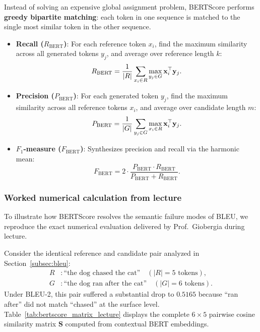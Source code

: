 \documentclass[../../../main.tex]{subfiles}
\begin{document}
Instead of solving an expensive global assignment problem, BERTScore performs \textbf{greedy bipartite matching}: each token in one sequence is matched to the single most similar token in the other sequence.
\begin{itemize}
    \item \textbf{Recall ($R_{\text{BERT}}$)}: For each reference token $x_i$, find the maximum similarity across all generated tokens $y_j$, and average over reference length $k$:
    \begin{equation}
    \label{eq:bertscore_recall}
    R_{\text{BERT}} = \frac{1}{|R|} \sum_{x_i \in R} \max_{y_j \in G} \mathbf{x}_i^\top \mathbf{y}_j.
    \end{equation}
    \item \textbf{Precision ($P_{\text{BERT}}$)}: For each generated token $y_j$, find the maximum similarity across all reference tokens $x_i$, and average over candidate length $m$:
    \begin{equation}
    \label{eq:bertscore_precision}
    P_{\text{BERT}} = \frac{1}{|G|} \sum_{y_j \in G} \max_{x_i \in R} \mathbf{x}_i^\top \mathbf{y}_j.
    \end{equation}
    \item \textbf{$F_1$-measure ($F_{\text{BERT}}$)}: Synthesizes precision and recall via the harmonic mean:
    \begin{equation}
    \label{eq:bertscore_f1}
    F_{\text{BERT}} = 2 \cdot \frac{P_{\text{BERT}} \cdot R_{\text{BERT}}}{P_{\text{BERT}} + R_{\text{BERT}}}.
    \end{equation}
\end{itemize}

\subsubsection{Worked numerical calculation from lecture}
To illustrate how BERTScore resolves the semantic failure modes of BLEU, we reproduce the exact numerical evaluation delivered by Prof.~Giobergia during lecture.

Consider the identical reference and candidate pair analyzed in Section~\ref{subsec:bleu}:
\begin{align*}
R &: \text{``the dog chased the cat''} \quad (|R| = 5 \text{ tokens}), \\
G &: \text{``the dog ran after the cat''} \quad (|G| = 6 \text{ tokens}).
\end{align*}
Under BLEU-2, this pair suffered a substantial drop to $0.5165$ because ``ran after'' did not match ``chased'' at the surface level. Table~\ref{tab:bertscore_matrix_lecture} displays the complete $6 \times 5$ pairwise cosine similarity matrix $\mathbf{S}$ computed from contextual BERT embeddings.
\end{document}

